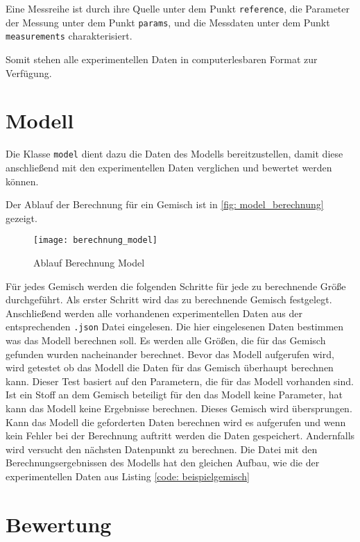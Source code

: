 \documentclass[../thesis.tex]{subfiles}
\begin{document}
Eine Messreihe ist durch ihre Quelle unter dem Punkt \texttt{reference}, die Parameter der Messung unter dem Punkt \texttt{params}, und die Messdaten unter dem Punkt \texttt{measurements} charakterisiert.

Somit stehen alle experimentellen Daten in computerlesbaren Format zur Verfügung.

\section{Modell}

Die Klasse \texttt{model} dient dazu die Daten des Modells bereitzustellen, damit diese anschließend mit den experimentellen Daten verglichen und bewertet werden können.

Der Ablauf der Berechnung für ein Gemisch ist in \autoref{fig: model_berechnung} gezeigt.

\begin{figure}[htb]
	\centering
	\texttt{[image: berechnung\_model]}
	\caption{Ablauf Berechnung Model}
	\label{fig: model_berechnung}
\end{figure}

Für jedes Gemisch werden die folgenden Schritte für jede zu berechnende Größe durchgeführt. Als erster Schritt wird das zu berechnende Gemisch festgelegt. Anschließend werden alle vorhandenen experimentellen Daten aus der entsprechenden \texttt{.json} Datei eingelesen. Die hier eingelesenen Daten bestimmen was das Modell berechnen soll. Es werden alle Größen, die für das Gemisch gefunden wurden nacheinander berechnet. Bevor das Modell aufgerufen wird, wird getestet ob das Modell die Daten für das Gemisch überhaupt berechnen kann. Dieser Test basiert auf den Parametern, die für das Modell vorhanden sind. Ist ein Stoff an dem Gemisch beteiligt für den das Modell keine Parameter, hat kann das Modell keine Ergebnisse berechnen. Dieses Gemisch wird übersprungen.
Kann das Modell die geforderten Daten berechnen wird es aufgerufen und wenn kein Fehler bei der Berechnung auftritt werden die Daten gespeichert. Andernfalls wird versucht den nächsten Datenpunkt zu berechnen. Die Datei mit den Berechnungsergebnissen des Modells hat den gleichen Aufbau, wie die der experimentellen Daten aus Listing \autoref{code: beispielgemisch}

\section{Bewertung}
\end{document}
